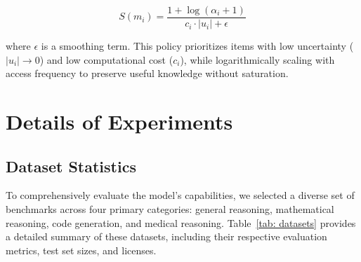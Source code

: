 \begin{equation}
    S(m_i) = \frac{1 + \log(\alpha_i + 1)}{c_i \cdot |u_i| + \epsilon}
\end{equation}

where $\epsilon$ is a smoothing term. This policy prioritizes items with low uncertainty ($|u_i| \to 0$) and low computational cost ($c_i$), while logarithmically scaling with access frequency to preserve useful knowledge without saturation.



\section{Details of Experiments}

\subsection{Dataset Statistics}
\begin{table}[!htbp]
\centering
{}
\caption{Dataset descriptions and statistics.}
\label{tab: datasets}
\end{table}

To comprehensively evaluate the model's capabilities, we selected a diverse set of benchmarks across four primary categories: general reasoning, mathematical reasoning, code generation, and medical reasoning. Table~\ref{tab: datasets} provides a detailed summary of these datasets, including their respective evaluation metrics, test set sizes, and licenses.


